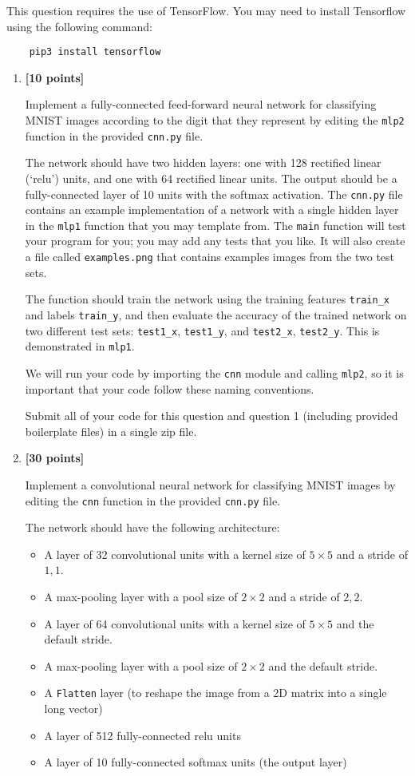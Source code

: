 \documentclass{article}
\newcounter{totalpoints}
\newcommand{\points}[1]{{\addtocounter{totalpoints}{#1}\textbf{[#1 points]}}}
\begin{document}
\begin{enumerate}
This question requires the use of TensorFlow.  You may need to install Tensorflow using the following command:
\begin{verbatim}
    pip3 install tensorflow
\end{verbatim}

\begin{enumerate}
\item\points{10}
Implement a fully-connected feed-forward neural network for classifying MNIST images according to the digit that they represent by editing the \verb|mlp2| function in the provided \texttt{cnn.py} file.

The network should have two hidden layers: one with 128 rectified linear (`relu') units, and one with 64 rectified linear units.  The output should be a fully-connected layer of 10 units with the softmax activation.  The \texttt{cnn.py} file contains an example implementation of a network with a single hidden layer in the \verb|mlp1| function that you may template from.  The \verb|main| function will test your program for you; you may add any tests that you like.
It will also create a file called \texttt{examples.png} that contains examples images from the two test sets.

The function should train the network using the training features \verb|train_x| and labels \verb|train_y|, and then evaluate the accuracy of the trained network on two different test sets: \verb|test1_x|, \verb|test1_y|, and \verb|test2_x|, \verb|test2_y|.
This is demonstrated in \verb|mlp1|.

We will run your code by importing the \verb|cnn| module and calling \verb|mlp2|, so it is important that your code follow these naming conventions.

Submit all of your code for this question and question 1 (including provided boilerplate files) in a single zip file.

\item\points{30}
Implement a convolutional neural network for classifying MNIST images by editing the \verb|cnn| function in the provided \texttt{cnn.py} file.

The network should have the following architecture:
\begin{itemize}
    \item A layer of 32 convolutional units with a kernel size of $5\times5$ and a stride of $1,1$.
    \item A max-pooling layer with a pool size of $2\times2$ and a stride of $2,2$.
    \item A layer of 64 convolutional units with a kernel size of $5\times5$ and the default stride.
    \item A max-pooling layer with a pool size of $2\times2$ and the default stride.
    \item A \verb|Flatten| layer (to reshape the image from a 2D matrix into a single long vector)
    \item A layer of 512 fully-connected relu units
    \item A layer of 10 fully-connected softmax units (the output layer)
\end{itemize}


\end{enumerate}
\end{enumerate}
\end{document}
